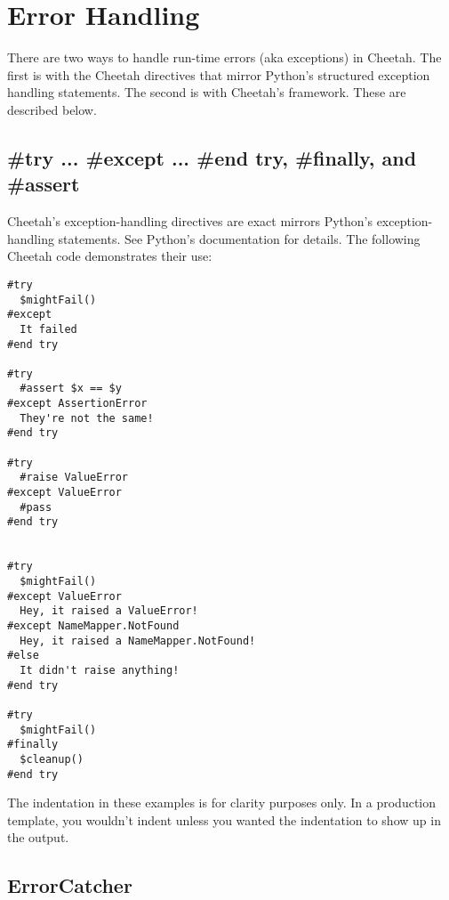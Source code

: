 \section{Error Handling}
\label{errorHandling}

There are two ways to handle run-time errors (aka exceptions) in Cheetah.  The
first is with the Cheetah directives that mirror Python's structured exception
handling statements. The second is with Cheetah's 
framework. These are described below.

\subsection{\#try ... \#except ... \#end try, \#finally, and \#assert}
\label{errorHandling.directives}

Cheetah's exception-handling directives are exact mirrors Python's 
exception-handling statements.  See Python's documentation for details.  The
following Cheetah code demonstrates their use:


\begin{verbatim}
#try
  $mightFail()
#except
  It failed
#end try

#try
  #assert $x == $y
#except AssertionError
  They're not the same!
#end try

#try
  #raise ValueError
#except ValueError
  #pass
#end try


#try
  $mightFail()
#except ValueError
  Hey, it raised a ValueError!
#except NameMapper.NotFound
  Hey, it raised a NameMapper.NotFound!
#else
  It didn't raise anything!
#end try

#try
  $mightFail()
#finally
  $cleanup()
#end try

\end{verbatim}    

The indentation in these examples is for clarity purposes only.  In a
production template, you wouldn't indent unless you wanted the indentation to
show up in the output.


\subsection{ErrorCatcher}
\label{errorHandling.errorCatcher}

